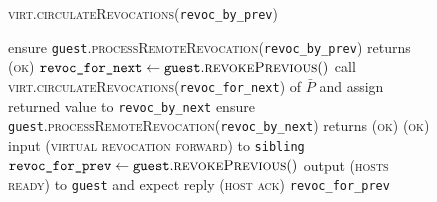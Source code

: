 \begin{figure}[H]
  \begin{processbox}{\textsc{virt.circulateRevocations}(\texttt{revoc\_by\_prev})}
    \begin{algorithmic}[1]
     
      \State ensure
      \texttt{guest}.\textsc{processRemoteRevocation}(\texttt{revoc\_by\_prev})
      returns (\textsc{ok})
    \Else \: 
      \State $\texttt{revoc\_for\_next} \gets
      \texttt{guest}.\textsc{revokePrevious}()$
      \State call \textsc{virt.circulateRevocations}(\texttt{revoc\_for\_next})
      of $\bar{P}$ and assign returned value to \texttt{revoc\_by\_next}
      \State ensure
      \texttt{guest}.\textsc{processRemoteRevocation}(\texttt{revoc\_by\_next})
      returns (\textsc{ok})
      \State \Return (\textsc{ok})
    \EndIf
     
      \State input (\textsc{virtual revocation forward}) to \texttt{sibling}
      \State {}
      \State {}
      \State {}
      \State {}
    \EndIf
    \State $\texttt{revoc\_for\_prev} \gets
    \texttt{guest}.\textsc{revokePrevious}()$
    \State output (\textsc{hosts ready}) to \texttt{guest} and expect reply
    (\textsc{host ack})
    \State \Return \texttt{revoc\_for\_prev} 
    \end{algorithmic}
  \end{processbox}
  \caption{}
  \label{code:virtual-layer:revocation}
\end{figure}

